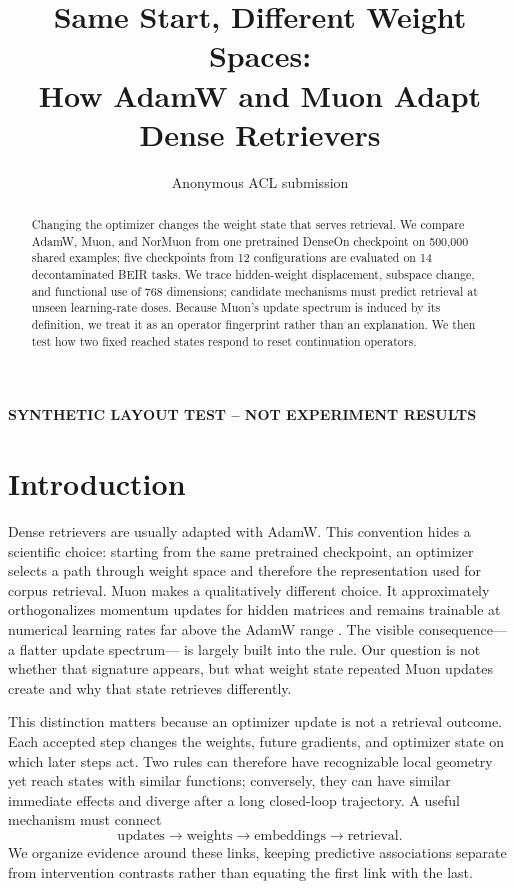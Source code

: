 \documentclass[11pt]{article}
\title{Same Start, Different Weight Spaces:\\
How AdamW and Muon Adapt Dense Retrievers}
\author{Anonymous ACL submission}
\begin{document}
\maketitle\begin{center}\textbf{SYNTHETIC LAYOUT TEST -- NOT EXPERIMENT RESULTS}\end{center}

\begin{abstract}
Changing the optimizer changes the weight state that serves retrieval. We compare AdamW, Muon, and
NorMuon from one pretrained DenseOn checkpoint on 500,000 shared examples; five checkpoints from
12 configurations are evaluated on 14 decontaminated BEIR tasks. \CorrectedAbstractFinding{} We
trace hidden-weight displacement, subspace change, and functional use of 768 dimensions; candidate
mechanisms must predict retrieval at unseen learning-rate doses. Because Muon's update spectrum is
induced by its definition, we treat it as an operator fingerprint rather than an explanation. We
then test how two fixed reached states respond to reset continuation operators.
\StateOperatorAbstractFinding{}
\end{abstract}

\section{Introduction}

Dense retrievers are usually adapted with AdamW. This convention hides a scientific choice:
starting from the same pretrained checkpoint, an optimizer selects a path through weight space and
therefore the representation used for corpus retrieval. Muon makes a qualitatively different
choice. It approximately orthogonalizes momentum updates for hidden matrices and remains trainable
at numerical learning rates far above the AdamW range
\citep{loshchilov2019decoupled,liu2025muon}. The visible consequence---a flatter update spectrum---
is largely built into the rule. Our question is not whether that signature appears, but what weight
state repeated Muon updates create and why that state retrieves differently.

This distinction matters because an optimizer update is not a retrieval outcome. Each accepted
step changes the weights, future gradients, and optimizer state on which later steps act. Two rules
can therefore have recognizable local geometry yet reach states with similar functions; conversely,
they can have similar immediate effects and diverge after a long closed-loop trajectory. A useful
mechanism must connect
\begin{equation*}
\text{updates}\rightarrow\text{weights}\rightarrow\text{embeddings}
\rightarrow\text{retrieval}.
\end{equation*}
We organize evidence around these links, keeping predictive associations separate from intervention
contrasts rather than equating the first link with the last.
\end{document}
